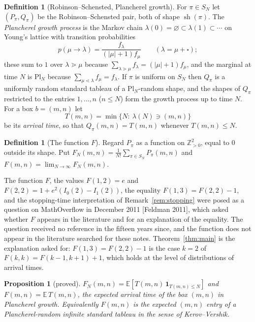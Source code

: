 \documentclass[11pt]{article}
\newtheorem{proposition}[theorem]{Proposition}
\theoremstyle{definition}
\newtheorem{definition}[theorem]{Definition}
\theoremstyle{remark}
\newcommand{\Z}{\mathbb{Z}}
\newcommand{\E}{\mathbb{E}}
\newcommand{\Pl}{\mathrm{Pl}}
\DeclareMathOperator{\sh}{sh}
\begin{document}
\begin{definition}[Robinson--Schensted, Plancherel growth]
For $\pi\in S_N$ let $(P_\pi,Q_\pi)$ be the Robinson--Schensted pair, both of shape $\sh(\pi)$. The \emph{Plancherel growth process} is the Markov chain $\lambda(0)=\varnothing\subset\lambda(1)\subset\cdots$ on Young's lattice with transition probabilities
\begin{equation}\label{eq:plgrowth}
p(\mu\to\lambda)=\frac{f_\lambda}{(|\mu|+1)f_\mu}\qquad(\lambda=\mu+\square);
\end{equation}
these sum to $1$ over $\lambda\gtrdot\mu$ because $\sum_{\lambda\gtrdot\mu}f_\lambda=(|\mu|+1)f_\mu$, and the marginal at time $N$ is $\Pl_N$ because $\sum_{\mu\lessdot\lambda}f_\mu=f_\lambda$. If $\pi$ is uniform on $S_N$ then $Q_\pi$ is a uniformly random standard tableau of a $\Pl_N$-random shape, and the shapes of $Q_\pi$ restricted to the entries $1,\dots,n$ ($n\le N$) form the growth process up to time $N$. For a box $b=(m,n)$ let
\[
T(m,n)=\min\{N:\ \lambda(N)\ni(m,n)\}
\]
be its \emph{arrival time}, so that $Q_\pi(m,n)=T(m,n)$ whenever $T(m,n)\le N$.
\end{definition}

\begin{definition}[The function $F$]
Regard $P_\pi$ as a function on $\Z_{>0}^2$, equal to $0$ outside its shape. Put $F_N(m,n)=\frac1{N!}\sum_{\pi\in S_N}P_\pi(m,n)$ and $F(m,n)=\lim_{N\to\infty}F_N(m,n)$.
\end{definition}

The function $F$, the values $F(1,2)=e$ and $F(2,2)=1+e^2(I_0(2)-I_1(2))$, the equality $F(1,3)=F(2,2)-1$, and the stopping-time interpretation of Remark~\ref{rem:stopping} were posed as a question on MathOverflow in December 2011 [Feldman 2011], which asked whether $F$ appears in the literature and for an explanation of the equality. The question received no reference in the fifteen years since, and the function does not appear in the literature searched for these notes. Theorem~\ref{thm:main} is the explanation asked for: $F(1,3)=F(2,2)-1$ is the case $k=2$ of $F(k,k)=F(k-1,k+1)+1$, which holds at the level of distributions of arrival times.

\begin{proposition}[proved]\label{prop:FisET}
$F_N(m,n)=\E[T(m,n)\,\mathbf 1_{T(m,n)\le N}]$ and $F(m,n)=\E\,T(m,n)$, the expected arrival time of the box $(m,n)$ in Plancherel growth. Equivalently $F(m,n)$ is the expected $(m,n)$ entry of a Plancherel-random infinite standard tableau in the sense of Kerov--Vershik.
\end{proposition}
\end{document}
